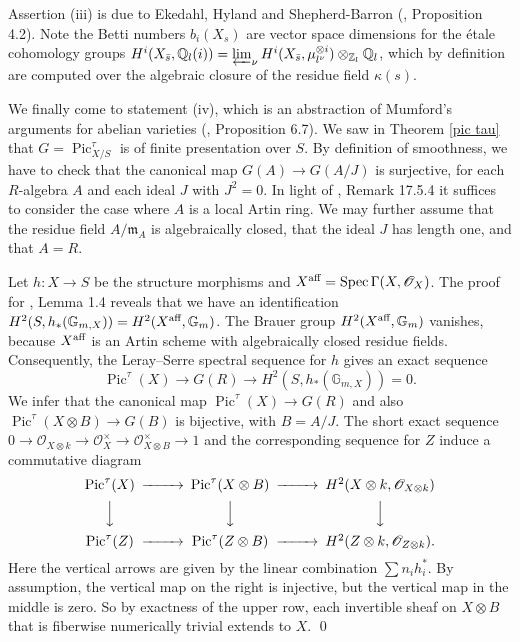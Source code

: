 \documentclass[oneside, 12pt]{amsart}
\theoremstyle{definition}
\theoremstyle{remark}
\newcommand{\ZZ}{\mathbb{Z}}
\newcommand{\QQ}{\mathbb{Q}}
\newcommand{\GG}{\mathbb{G}}
\newcommand{\aff}{\text{\rm aff}}
\newcommand{\invlim}{\varprojlim}
\newcommand{\lra}{\longrightarrow}
\newcommand{\maxid}{\mathfrak{m}}
\renewcommand{\O}{\mathscr{O}}
\newcommand{\Pic}{\operatorname{Pic}}
\newcommand{\ra}{\rightarrow}
\newcommand{\Spec}{\operatorname{Spec}}
\begin{document}
Assertion (iii) is due to Ekedahl, Hyland and Shepherd-Barron (\cite{Ekedahl; Hyland; Shepherd-Barron 2012}, Proposition 4.2).
Note the   Betti numbers $b_i(X_s)$ are  vector space dimensions for
the \'etale cohomology groups 
$H^i(X_{\bar{s}},\QQ_l(i)) = \invlim_{\nu} H^i(X_{\bar{s}},\mu_{l^\nu}^{\otimes i})\otimes_{\ZZ_l}\QQ_l
$,
which by definition are computed over the algebraic closure of the residue field $\kappa(s)$.

We finally  come to statement (iv), which is an abstraction of Mumford's arguments for abelian varieties
(\cite{Mumford; Fogarty; Kirwan 1993}, Proposition 6.7).
 We saw in Theorem \ref{pic tau} that $G=\Pic_{X/S}^\tau$ is of finite presentation
over $S$. By   definition of smoothness, we have to check that the canonical map
$G(A)\ra G(A/J)$ is surjective, for each $R$-algebra $A$ and each ideal $J$ with $J^2=0$.
In light of \cite{EGA IVd}, Remark 17.5.4 it suffices
to consider the case where $A$ is a local Artin ring. We may further assume that 
the residue field $A/\maxid_A$ is algebraically closed,   that the ideal $J$ has length one,
and that $A=R$. 

Let $h:X\ra S$ be the structure morphisms and $X^\aff=\Spec \Gamma(X,\O_X)$.
The proof for \cite{Schroeer 2020}, Lemma 1.4 reveals that we have an identification
$H^2(S, h_*(\GG_{m,X})) = H^2(X^\aff,\GG_m)$. The Brauer group $H^2(X^\aff,\GG_m)$ vanishes,   because  $X^\aff$ is
an Artin scheme with algebraically closed residue fields. Consequently, the Leray--Serre spectral sequence
for $h$ gives an exact sequence
$$
\Pic^\tau(X)\lra G(R)\lra H^2(S, h_*(\GG_{m,X}))=0.
$$
We infer that  the canonical map  $\Pic^\tau(X)\ra G(R)$ and   also $\Pic^\tau(X\otimes B)\ra G(B)$ is bijective, with $B=A/J$.
The short exact sequence $0\ra \O_{X\otimes k}\ra \O_X^\times\ra \O_{X\otimes B}^\times \ra 1$
and the corresponding sequence for $Z$ induce a commutative diagram
\[
\begin{CD}
\Pic^\tau(X) @>>>       \Pic^\tau(X\otimes B)    @>>>       H^2(X\otimes k,\O_{X\otimes k})\\
@VVV                    @VVV                                @VVV            \\
\Pic^\tau(Z) @>>>       \Pic^\tau(Z\otimes B)    @>>>       H^2(Z\otimes k,\O_{Z\otimes k}).
\end{CD}
\]
Here the vertical arrows are given by the linear combination $\sum n_ih_i^*$.
By assumption, the vertical map on the right is injective, but the vertical map in the middle is zero.
So by  exactness of the upper row, each invertible sheaf on $X\otimes B$ that is fiberwise numerically trivial extends to $X$.
\qed
\end{document}
